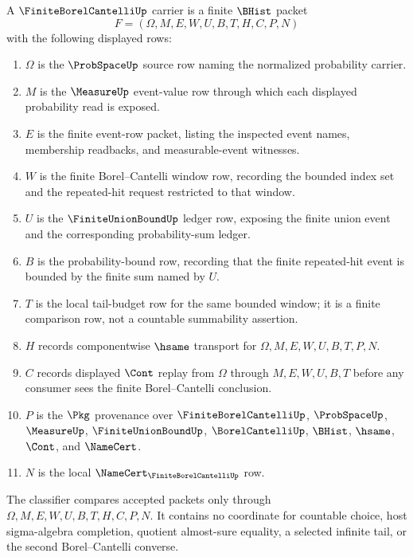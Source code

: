 \begin{definition}
\label{def:finite-borel-cantelli-carrier}
A $\FiniteBorelCantelliUp$ carrier is a finite $\BHist$ packet
$$
F=(\Omega,M,E,W,U,B,T,H,C,P,N)
$$
with the following displayed rows:
\begin{enumerate}
\item $\Omega$ is the $\ProbSpaceUp$ source row naming the normalized probability carrier.
\item $M$ is the $\MeasureUp$ event-value row through which each displayed probability read is exposed.
\item $E$ is the finite event-row packet, listing the inspected event names, membership readbacks, and measurable-event witnesses.
\item $W$ is the finite Borel--Cantelli window row, recording the bounded index set and the repeated-hit request restricted to that window.
\item $U$ is the $\FiniteUnionBoundUp$ ledger row, exposing the finite union event and the corresponding probability-sum ledger.
\item $B$ is the probability-bound row, recording that the finite repeated-hit event is bounded by the finite sum named by $U$.
\item $T$ is the local tail-budget row for the same bounded window; it is a finite comparison row, not a countable summability assertion.
\item $H$ records componentwise $\hsame$ transport for $\Omega,M,E,W,U,B,T,P,N$.
\item $C$ records displayed $\Cont$ replay from $\Omega$ through $M,E,W,U,B,T$ before any consumer sees the finite Borel--Cantelli conclusion.
\item $P$ is the $\Pkg$ provenance over $\FiniteBorelCantelliUp$, $\ProbSpaceUp$, $\MeasureUp$, $\FiniteUnionBoundUp$, $\BorelCantelliUp$, $\BHist$, $\hsame$, $\Cont$, and $\NameCert$.
\item $N$ is the local $\NameCert_{\FiniteBorelCantelliUp}$ row.
\end{enumerate}
The classifier compares accepted packets only through $\Omega,M,E,W,U,B,T,H,C,P,N$. It contains no coordinate for countable choice, host sigma-algebra completion, quotient almost-sure equality, a selected infinite tail, or the second Borel--Cantelli converse.
\end{definition}


